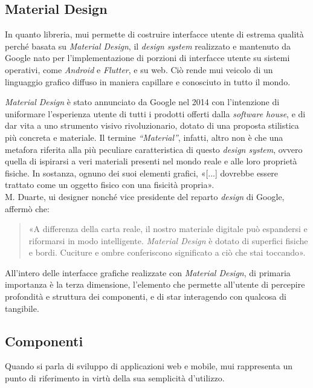 \subsection{Material Design}
In quanto libreria, \acrlong{mui} permette di costruire interfacce utente di estrema qualità perché basata su \textit{Material Design}, il \textit{design system} realizzato e mantenuto da Google nato per l'implementazione di porzioni di interfacce utente su sistemi operativi, come \textit{Android} e \textit{Flutter}, e su web. Ciò rende \acrshort{mui} veicolo di un linguaggio grafico diffuso in maniera capillare e conosciuto in tutto il mondo.

\textit{Material Design} è stato annunciato da Google nel 2014 con l'intenzione di uniformare l'esperienza utente di tutti i prodotti offerti dalla \textit{software house}, e di dar vita a uno strumento visivo rivoluzionario, dotato di una proposta stilistica più concreta e materiale. Il termine \textit{“Material”}, infatti, altro non è che una metafora riferita alla più peculiare caratteristica di questo \textit{design system}, ovvero quella di ispirarsi a veri materiali presenti nel mondo reale e alle loro proprietà fisiche. In sostanza, ognuno dei suoi elementi grafici, «[...] dovrebbe essere trattato come un oggetto fisico con una fisicità propria»\cite{Mew_LearningMaterialDesign}.\\ 
M. Duarte, \acrshort{ui} designer nonché vice presidente del reparto \textit{design} di Google, affermò che:
\begin{quote}
  «A differenza della carta reale, il nostro materiale digitale può espandersi e riformarsi in modo intelligente. \textit{Material Design} è dotato di superfici fisiche e bordi. Cuciture e ombre conferiscono significato a ciò che stai toccando».
\end{quote}
All'intero delle interfacce grafiche realizzate con \textit{Material Design}, di primaria importanza è la terza dimensione, l'elemento che permette all'utente di percepire profondità e struttura dei componenti, e di star interagendo con qualcosa di tangibile.

\subsection{Componenti}
Quando si parla di sviluppo di applicazioni web e mobile, \acrlong{mui} rappresenta un punto di riferimento in virtù della sua semplicità d'utilizzo. 


